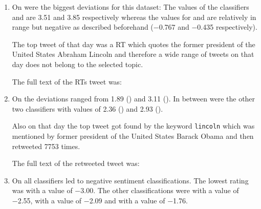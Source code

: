 \begin{enumerate}
    \item 
        On  were the biggest deviations for this dataset:
        The values of the classifiers \ftb{} and \fme{} are \num{3.51} and \num{3.85} respectively whereas the values for \fnb{} and \fsvm{} are relatively in range but negative as described beforehand (\num{-0.767} and \num{-0.435} respectively).

        
        The top tweet of that day was a \ac{RT} which quotes the former president of the United States Abraham Lincoln and therefore a wide range of tweets on that day does not belong to the selected topic.

        The full text of the \acp{RT} tweet was:

    \item 
        On  the deviations ranged from \num{1.89} (\ftb{}) and \num{3.11} (\fnb{}).
        In between were the other two classifiers with values of \num{2.36} (\fme{}) and \num{2.93} (\fsvm{}).


        Also on that day the top tweet got found by the keyword \texttt{lincoln} which was mentioned by former president of the United States Barack Obama and then retweeted \num{7753} times.

        The full text of the retweeted tweet was:

    \item 
        On  all classifiers led to negative sentiment classifications.
        The lowest rating was \fnb{} with a value of \num{-3.00}.
        The other classifications were \fsvm{} with a value of \num{-2.55}, \fme{} with a value of \num{-2.09} and \ftb{} with a value of \num{-1.76}.



\end{enumerate}
